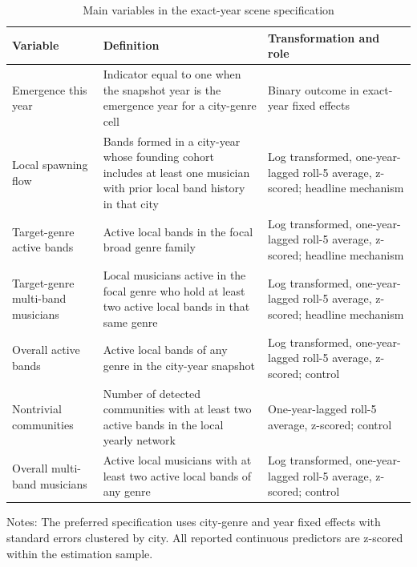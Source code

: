 \begin{table}[htbp]
\centering
\caption{Main variables in the exact-year scene specification}
\label{tab:main_variables}
\small
\begin{tabularx}{\textwidth}{@{}lY Y@{}}
\toprule
Variable & Definition & Transformation and role \\
\midrule
Emergence this year & Indicator equal to one when the snapshot year is the emergence year for a city-genre cell & Binary outcome in exact-year fixed effects \\
Local spawning flow & Bands formed in a city-year whose founding cohort includes at least one musician with prior local band history in that city & Log transformed, one-year-lagged roll-5 average, z-scored; headline mechanism \\
Target-genre active bands & Active local bands in the focal broad genre family & Log transformed, one-year-lagged roll-5 average, z-scored; headline mechanism \\
Target-genre multi-band musicians & Local musicians active in the focal genre who hold at least two active local bands in that same genre & Log transformed, one-year-lagged roll-5 average, z-scored; headline mechanism \\
Overall active bands & Active local bands of any genre in the city-year snapshot & Log transformed, one-year-lagged roll-5 average, z-scored; control \\
Nontrivial communities & Number of detected communities with at least two active bands in the local yearly network & One-year-lagged roll-5 average, z-scored; control \\
Overall multi-band musicians & Active local musicians with at least two active local bands of any genre & Log transformed, one-year-lagged roll-5 average, z-scored; control \\
\bottomrule
\end{tabularx}

\vspace{0.4em}
\parbox{0.96\textwidth}{\footnotesize Notes: The preferred specification uses city-genre and year
fixed effects with standard errors clustered by city. All reported continuous predictors are
z-scored within the estimation sample.}
\end{table}

